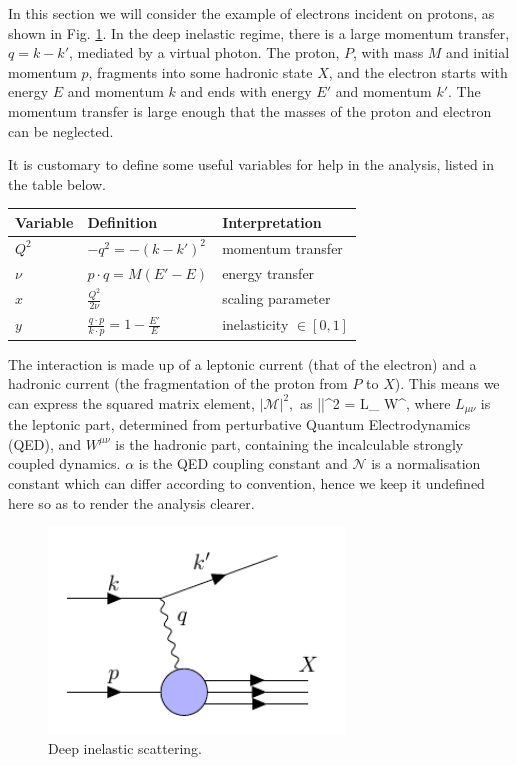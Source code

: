 In this section we will consider the example of electrons incident on protons, as shown in Fig. \ref{fig:dis}. In the deep inelastic regime, there is a large momentum transfer, $q=k-k'$, mediated by a virtual photon. The proton, $P$, with mass $M$ and initial momentum $p$, fragments into some hadronic state $X$, and the electron starts with energy $E$ and momentum $k$ and ends with energy $E'$ and momentum $k'$. The momentum transfer is large enough that the masses of the proton and electron can be neglected. 

It is customary to define some useful variables for help in the analysis, listed in the table below.
\begin{table}[H]
\centering
\begin{tabular}{l|l|l}
  Variable & Definition & Interpretation   \\
 \hline
  $Q^2$ & $- q^2 = -(k-k')^2$   & momentum transfer    \\
  $\nu$ & $p \cdot q = M(E'-E)$ & energy transfer  \\
  $x$   & $\frac{Q^2}{2\nu}$    & scaling parameter \\
  $y$   & $\frac{q \cdot p}{k \cdot p} = 1 - \frac{E'}{E}$ & inelasticity $\in [0,1]$
\end{tabular}
\end{table}
The interaction is made up of a leptonic current (that of the electron) and a hadronic current (the fragmentation of the proton from $P$ to $X$). This means we can express the squared matrix element, $|\mathcal{M}|^2,$ as
\be
\label{eqn:matrixelement}
||^2 =   L_{\mu\nu} W^{\mu\nu},
\ee
where $L_{\mu\nu}$ is the leptonic part, determined from perturbative Quantum Electrodynamics (QED), and $W^{\mu\nu}$ is the hadronic part, containing the incalculable strongly coupled dynamics. $\alpha$ is the QED coupling constant and $\mathcal{N}$ is a normalisation constant which can differ according to convention, hence we keep it undefined here so as to render the analysis clearer.
\begin{figure}[H]
\centering
\includegraphics[width=0.7\textwidth]{../diagrams/disdiag.pdf}
\caption{Deep inelastic scattering. \label{fig:dis}}
\end{figure}

